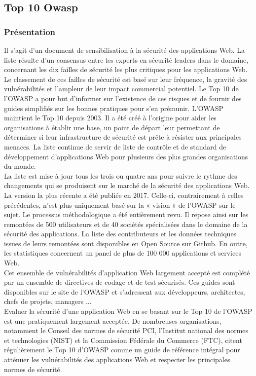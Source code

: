 \subsection{Top 10 Owasp}
\subsubsection{Présentation}
Il s’agit d’un document de sensibilisation à la sécurité des applications Web. La liste résulte d’un consensus entre les experts en sécurité leaders dans le domaine, concernant les dix failles de sécurité les plus critiques pour les applications Web. Le classement de ces failles de sécurité est basé sur leur fréquence, la gravité des vulnérabilités et l'ampleur de leur impact commercial potentiel. Le Top 10 de l’OWASP a pour but d’informer sur l’existence de ces risques et de fournir des guides simplifiés sur les bonnes pratiques pour s’en prémunir. L’OWASP maintient le Top 10 depuis 2003. Il a été créé à l'origine pour aider les organisations à établir une base, un point de départ leur permettant de déterminer si leur infrastructure de sécurité est prête à résister aux principales menaces. La liste continue de servir de liste de contrôle et de standard de développement d'applications Web pour plusieurs des plus grandes organisations du monde. \\
La liste est mise à jour tous les trois ou quatre ans pour suivre le rythme des changements qui se produisent sur le marché de la sécurité des applications Web. La version la plus récente a été publiée en 2017. Celle-ci, contrairement à celles précédentes, n’est plus uniquement basé sur la « vision » de l’OWASP sur le sujet. Le processus méthodologique a été entièrement revu. Il repose ainsi sur les remontées de 500 utilisateurs et de 40 sociétés spécialisées dans le domaine de la sécurité des applications. La liste des contributeurs et les données techniques issues de leurs remontées sont disponibles en Open Source sur Github. En outre, les statistiques concernent un panel de plus de 100 000 applications et services Web.\\
Cet ensemble de vulnérabilités d'application Web largement accepté est complété par un ensemble de directives de codage et de test sécurisés. Ces guides sont disponibles sur le site de l'OWASP et s'adressent aux développeurs, architectes, chefs de projets, managers ... \\
Evaluer la sécurité d’une application Web en se basant sur le Top 10 de l’OWASP est une pratiquement largement acceptée. De nombreuses organisations, notamment le Conseil des normes de sécurité PCI, l'Institut national des normes et technologies (NIST) et la Commission Fédérale du Commerce (FTC), citent régulièrement le Top 10 d'OWASP comme un guide de référence intégral pour atténuer les vulnérabilités des applications Web et respecter les principales normes de sécurité. 

